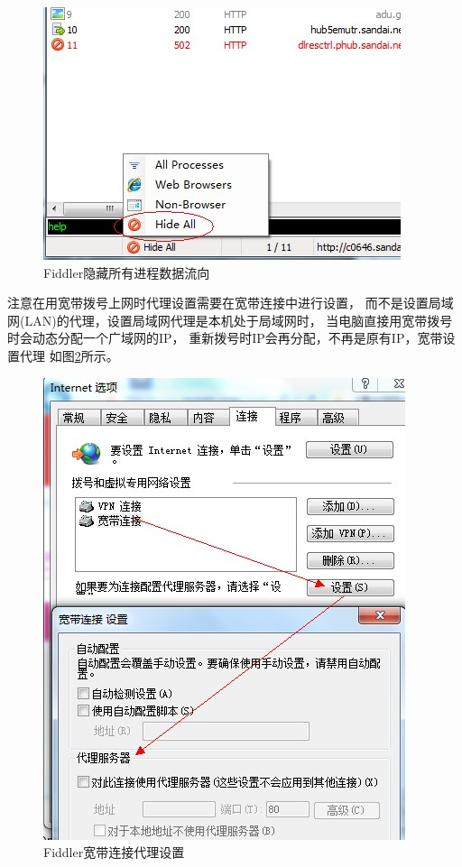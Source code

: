 \documentclass{book}
\begin{document}
\begin{figure}[htbp]
	\centering
	\includegraphics[scale=0.5]{HideAllProcessCapture.jpg}
	\caption{Fiddler隐藏所有进程数据流向}
	\label{fig:HideAllProcessCapture}
\end{figure}

注意在用宽带拨号上网时代理设置需要在宽带连接中进行设置，
而不是设置局域网(LAN)的代理，设置局域网代理是本机处于局域网时，
当电脑直接用宽带拨号时会动态分配一个广域网的IP，
重新拨号时IP会再分配，不再是原有IP，宽带设置代理
如图\ref{fig:BrandwithProxySetting}所示。

\begin{figure}[htbp]
	\centering
	\includegraphics[scale=0.5]{BrandwithProxySetting.jpg}
	\caption{Fiddler宽带连接代理设置}
	\label{fig:BrandwithProxySetting}
\end{figure}
\end{document}
